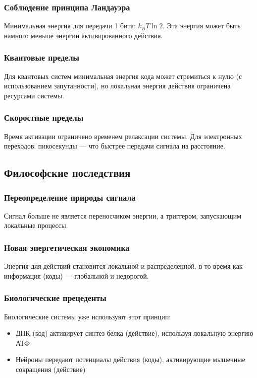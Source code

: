 \documentclass[11pt,a4paper]{article}
\begin{document}
	\subsubsection{Соблюдение принципа Ландауэра}
	Минимальная энергия для передачи 1 бита: $k_B T \ln 2$. Эта энергия может быть намного меньше энергии активированного действия.
	
	\subsubsection{Квантовые пределы}
	Для квантовых систем минимальная энергия кода может стремиться к нулю (с использованием запутанности), но локальная энергия действия ограничена ресурсами системы.
	
	\subsubsection{Скоростные пределы}
	Время активации ограничено временем релаксации системы. Для электронных переходов: пикосекунды — что быстрее передачи сигнала на расстояние.
	
	\subsection{Философские последствия}
	
	\subsubsection{Переопределение природы сигнала}
	Сигнал больше не является переносчиком энергии, а триггером, запускающим локальные процессы.
	
	\subsubsection{Новая энергетическая экономика}
	Энергия для действий становится локальной и распределенной, в то время как информация (коды) — глобальной и недорогой.
	
	\subsubsection{Биологические прецеденты}
	Биологические системы уже используют этот принцип:
	\begin{itemize}
		\item ДНК (код) активирует синтез белка (действие), используя локальную энергию АТФ
		\item Нейроны передают потенциалы действия (коды), активирующие мышечные сокращения (действие)
	\end{itemize}
	
\end{document}
